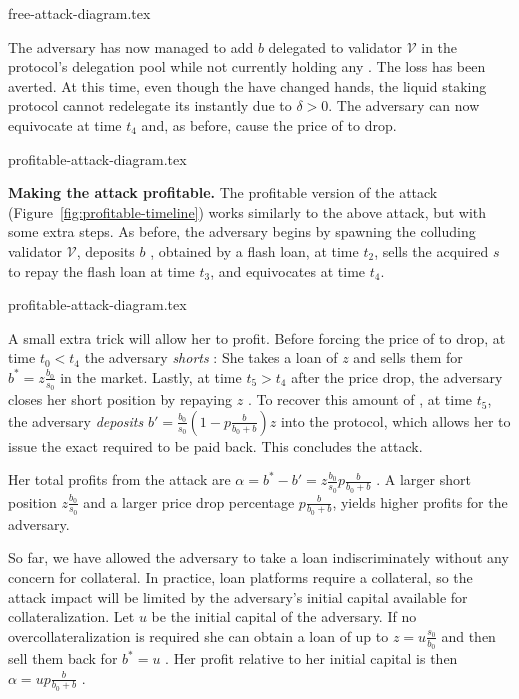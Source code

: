 \iflncs
  {free-attack-diagram.tex}
\fi

The adversary has now managed to add $b$ \asset delegated to validator $\mathcal{V}$
in the protocol's delegation pool while not currently holding
any \stasset. The loss has been averted.
At this time, even though the
\stassets have changed hands, the liquid staking protocol cannot redelegate
its \assets instantly due to $\delta > 0$.
The adversary can now equivocate at time $t_4$ and, as before, cause the
price of \stasset to drop.

\ifccs
  {profitable-attack-diagram.tex}
\fi

\noindent
\textbf{Making the attack profitable.}
The profitable version of the attack (Figure~\ref{fig:profitable-timeline}) works similarly to the above
attack, but with some extra steps. As before, the adversary begins by spawning the
colluding validator $\mathcal{V}$, deposits $b$ \asset, obtained by a flash loan, at time $t_2$,
sells the acquired $s$ \stasset to repay the flash loan at time $t_3$, and equivocates at time $t_4$.

\iflncs
  {profitable-attack-diagram.tex}
\fi

A small extra trick will allow her to profit.
Before forcing the price of \stasset to drop, at time $t_0 < t_4$
the adversary \emph{shorts}
\stasset: She takes a loan of $z$ \stassets and
sells them for $b^* = z \frac{b_0}{s_0}$ \asset in the market.
Lastly, at time $t_5 > t_4$ after the price drop, the adversary closes her short position by repaying $z$
\stasset.
To recover this amount of \stasset, at time $t_5$, the adversary \emph{deposits}
$b' = \frac{b_0}{s_0}(1 - p\frac{b}{b_0 + b}) z$ \asset
into the protocol, which allows her to issue the exact required \stasset
to be paid back. This concludes the attack.

Her total profits from the attack are
$\alpha = b^* - b' = z \frac{b_0}{s_0} p \frac{b}{b_0 + b}$ \asset.
A larger short position $z \frac{b_0}{s_0}$ and a larger
\stasset price drop percentage $p \frac{b}{b_0 + b}$, yields higher profits for the adversary.

So far, we have allowed the adversary to take a loan indiscriminately without
any concern for collateral. In practice, loan platforms
require a collateral, so the attack impact will be limited by the adversary's
initial capital available for collateralization.
Let $u$ \asset be the initial capital of the adversary.
If no overcollateralization is required she can obtain a
loan of up to $z = u \frac{s_0}{b_0}$ \stasset and
then sell them back for $b^* = u$ \asset.
Her profit relative to her initial capital is then
$\alpha = u p \frac{b}{b_0 + b}$ \asset.


